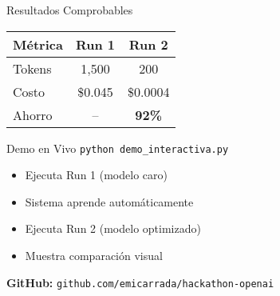 \documentclass[aspectratio=169,14pt]{beamer}
\begin{document}
\begin{frame}{Resultados Comprobables}

\begin{table}[h]
\centering
\Large
\begin{tabular}{lcc}
\textbf{Métrica} & \textbf{Run 1} & \textbf{Run 2} \\
\hline
Tokens & 1,500 & 200 \\
Costo & \$0.045 & \$0.0004 \\
Ahorro & -- & \textcolor{maingreen}{\textbf{92\%}} \\
\end{tabular}
\end{table}

\vspace{0.5cm}

\begin{block}{Demo en Vivo}
\texttt{python demo\_interactiva.py}
\begin{itemize}
    \item Ejecuta Run 1 (modelo caro)
    \item Sistema aprende automáticamente
    \item Ejecuta Run 2 (modelo optimizado)
    \item Muestra comparación visual
\end{itemize}
\end{block}

\vspace{0.3cm}

\begin{center}
\textbf{GitHub:} \texttt{github.com/emicarrada/hackathon-openai}
\end{center}

\end{frame}
\end{document}
